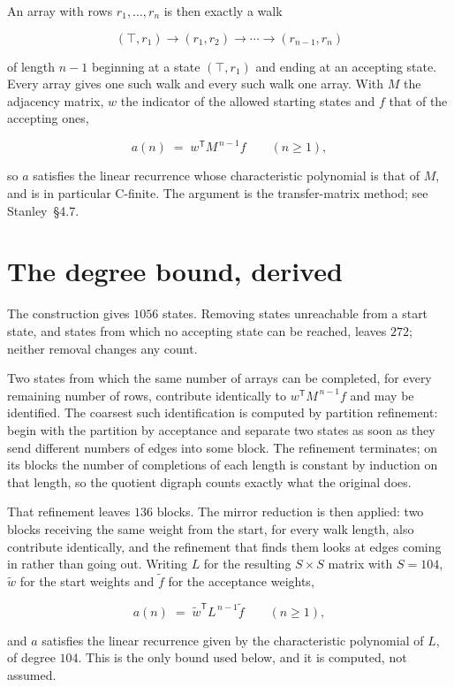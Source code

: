 \documentclass[11pt]{article}
\theoremstyle{definition}
\begin{document}
An array with rows $r_1,\dots,r_n$ is then exactly a walk

\[(\top,r_1) \to (r_1,r_2) \to \cdots \to (r_{n-1},r_n)\]

of length $n-1$ beginning at a state $(\top,r_1)$ and ending at an accepting state. Every array gives one such walk and every such walk one array. With $M$ the adjacency matrix, $w$ the indicator of the allowed starting states and $f$ that of the accepting ones,

\[a(n) \;=\; w^{\mathsf T} M^{\,n-1} f \qquad (n \ge 1),\]

so $a$ satisfies the linear recurrence whose characteristic polynomial is that of $M$, and is in particular C-finite. The argument is the transfer-matrix method; see Stanley~\S4.7.

\section{The degree bound, derived}

The construction gives $1056$ states. Removing states unreachable from a start state, and states from which no accepting state can be reached, leaves $272$; neither removal changes any count.

Two states from which the same number of arrays can be completed, for every remaining number of rows, contribute identically to $w^{\mathsf T}M^{\,n-1}f$ and may be identified. The coarsest such identification is computed by partition refinement: begin with the partition by acceptance and separate two states as soon as they send different numbers of edges into some block. The refinement terminates; on its blocks the number of completions of each length is constant by induction on that length, so the quotient digraph counts exactly what the original does.

That refinement leaves $136$ blocks. The mirror reduction is then applied: two blocks receiving the same weight from the start, for every walk length, also contribute identically, and the refinement that finds them looks at edges coming in rather than going out. Writing $L$ for the resulting $S \times S$ matrix with $S = 104$, $\tilde w$ for the start weights and $\tilde f$ for the acceptance weights,

\[a(n) \;=\; \tilde w^{\mathsf T} L^{\,n-1} \tilde f \qquad (n \ge 1),\]

and $a$ satisfies the linear recurrence given by the characteristic polynomial of $L$, of degree $104$. This is the only bound used below, and it is computed, not assumed.
\end{document}
